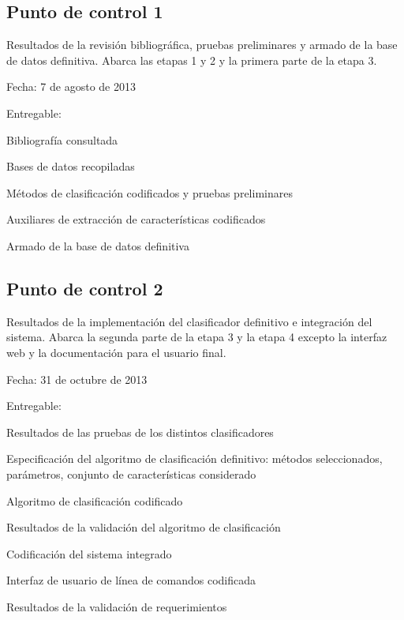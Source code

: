 \documentclass[12pt,bibliography=oldstyle,DIV=12,parskip=full-,titlepage]{scrartcl}
\begin{document}
\subsection{Punto de control 1}
Resultados de la revisión bibliográfica, pruebas preliminares y armado
de la base de datos definitiva.  Abarca las etapas 1 y 2 y la primera
parte de la etapa 3.
\begin{description*}
  \item[Fecha:] 7 de agosto de 2013
  \item[Entregable:]
  \item
    \begin{minipage}{\textwidth}
      \medskip
      \begin{itemize*}
      \item Bibliografía consultada
      \item Bases de datos recopiladas
      \item Métodos de clasificación codificados y pruebas preliminares
      \item Auxiliares de extracción de características codificados
      \item Armado de la base de datos definitiva
      \end{itemize*}
    \end{minipage}
\end{description*}
\newpage
\subsection{Punto de control 2}
Resultados de la implementación del clasificador definitivo e
integración del sistema. Abarca la segunda parte de la etapa 3 y la
etapa 4 excepto la interfaz web y la documentación para el usuario
final.
\begin{description*}
  \item[Fecha:] 31 de octubre de 2013
  \item[Entregable:]
  \item
    \begin{minipage}{\textwidth}
      \medskip
      \begin{itemize*}
      \item Resultados de las pruebas de los distintos clasificadores
      \item Especificación del algoritmo de clasificación definitivo:
        métodos seleccionados, parámetros, conjunto de características
        considerado
      \item Algoritmo de clasificación codificado
      \item Resultados de la validación del algoritmo de clasificación
      \item Codificación del sistema integrado
      \item Interfaz de usuario de línea de comandos codificada
      \item Resultados de la validación de requerimientos
      \end{itemize*}
    \end{minipage}
\end{description*}
\end{document}
